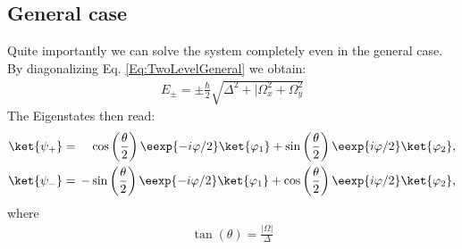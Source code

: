 \subsection{General case}

Quite importantly we can solve the system completely even in the general case. By diagonalizing  Eq. \eqref{Eq:TwoLevelGeneral} we obtain:
\begin{align}\label{eq:Epm}
 E_\pm = \pm \frac{\hbar}{2} \sqrt{\Delta^2+|\Omega_x^2+\Omega_y^2}
\end{align}
The Eigenstates then read:
\begin{align}
				\ket{\psi_+}&=&\hspace{-2mm}&\cos\left(\frac{\theta}{2}\right) \eexp{-i{\varphi}/{2}}\ket{\varphi_1}+\sin\left(\frac{\theta}{2}\right) \eexp{i{\varphi}/{2}}\ket{\varphi_2}, \label{eq:staticpsiplus} \\ 
				\ket{\psi_-}&=&\hspace{-2mm}-&\sin\left(\frac{\theta}{2}\right) \eexp{-i{\varphi}/{2}}\ket{\varphi_1}+\cos\left(\frac{\theta}{2}\right) \eexp{i{\varphi}/{2}}\ket{\varphi_2}, \label{eq:staticpsiminus}
\end{align}
where 
\begin{align} \label{eq:parameters}
	\tan(\theta) = \frac{|\Omega|}{\Delta} 
\end{align}